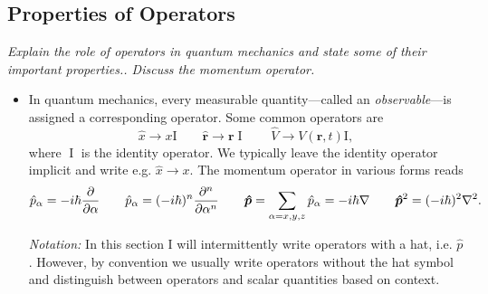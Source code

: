 \documentclass[11pt, a4paper]{article}
\renewcommand{\grad}{\nabla}
\renewcommand{\laplacian}{\nabla^{2}}
\renewcommand{\vec}[1]{\bm{#1}}  %
\renewcommand{\r}{\vec{r}}  %
\newcommand{\II}{\operatorname{I}}  %
\begin{document}
\subsection{Properties of Operators}
\textit{Explain the role of operators in quantum mechanics and state some of their important properties.. Discuss the momentum operator.}
\begin{itemize}
	\item In quantum mechanics, every measurable quantity---called an \textit{observable}---is assigned a corresponding operator. Some common operators are
	\begin{equation*}
		\hat{x} \to x \mathrm{I} \qquad \hat{\r} \to \r \II \qquad \hat{V} \to V(\r, t)\mathrm{I},
	\end{equation*}
	where $ \II $ is the identity operator. We typically leave the identity operator implicit and write e.g. $ \hat{x} \to x $. The momentum operator in various forms reads
	\begin{equation*}
		\hat{p}_{\alpha} = -i\hbar \pdv{}{\alpha} \qquad \hat{p}_{\alpha} = (-i\hbar)^{n} \pdv[n]{}{\alpha} \qquad \vec{\hat{p}} = \sum_{\alpha = x, y, z} \hat{p}_{\alpha} = - i \hbar \grad \qquad \vec{\hat{p}}^{2} = (-i\hbar)^{2} \laplacian.
	\end{equation*}
	
	\textit{Notation:} In this section I will intermittently write operators with a hat, i.e. $ \hat{p} $. However, by convention we usually write operators without the hat symbol and distinguish between operators and scalar quantities based on context.
\end{itemize}
\end{document}
